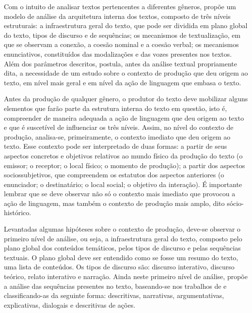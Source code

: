 Com o intuito de analisar textos pertencentes a diferentes gêneros,
\textcite{bronckart_atividade_1999,bronckart_atividade_2006} propõe um modelo de análise da arquitetura
interna dos textos, composto de três níveis estruturais: a
infraestrutura geral do texto, que pode ser dividida em plano global do
texto, tipos de discurso e de sequências; os mecanismos de
textualização, em que se observam a conexão, a coesão nominal e a coesão
verbal; os mecanismos enunciativos, constituídos das modalizações e das
vozes presentes nos textos. Além dos parâmetros descritos, \textcite{bronckart_atividade_1999,bronckart_atividade_2006} postula, antes da análise textual propriamente dita, a
necessidade de um estudo sobre o contexto de produção que deu origem ao
texto, em nível mais geral e em nível da ação de linguagem que embasa o
texto.

Antes da produção de qualquer gênero, o produtor do texto deve mobilizar
alguns elementos que farão parte da estrutura interna do texto em
questão, isto é, compreender de maneira adequada a ação de linguagem que
deu origem ao texto e que é suscetível de influenciar os três níveis.
Assim, no nível do contexto de produção, analisa-se, primeiramente, o
contexto imediato que deu origem ao texto. Esse contexto pode ser
interpretado de duas formas: a partir de seus aspectos concretos e
objetivos relativos ao mundo físico da produção do texto (o emissor; o
receptor; o local físico; o momento de produção); a partir dos aspectos
sociossubjetivos, que compreendem os estatutos dos aspectos anteriores
(o enunciador; o destinatário; o local social; o objetivo da interação).
É importante lembrar que se deve observar não só o contexto mais
imediato que provocou a ação de linguagem, mas também o contexto de
produção mais amplo, dito sócio-histórico.

Levantadas algumas hipóteses sobre o contexto de produção, deve-se
observar o primeiro nível de análise, ou seja, a infraestrutura geral do
texto, composto pelo plano global dos conteúdos temáticos, pelos tipos
de discurso e pelas sequências textuais. O plano global deve ser
entendido como se fosse um resumo do texto, uma lista de conteúdos. Os
tipos de discurso são: discurso interativo, discurso teórico, relato
interativo e narração. Ainda neste primeiro nível de análise, \textcite{bronckart_atividade_1999} propõe a análise das sequências presentes no texto, baseando-se
nos trabalhos de \cite{adam_1992} e classificando-as da seguinte forma:
descritivas, narrativas, argumentativas, explicativas, dialogais e
descritivas de ações.

